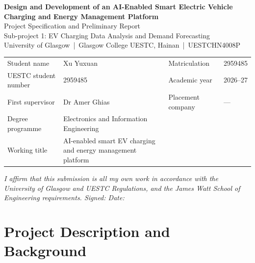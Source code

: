 \documentclass[10pt,a4paper]{article}
\begin{document}
\begin{center}
  {\large\bfseries Design and Development of an AI-Enabled Smart Electric Vehicle\\
   Charging and Energy Management Platform}\\[4pt]
  {\normalsize Project Specification and Preliminary Report}\\[2pt]
  {\small Sub-project 1: EV Charging Data Analysis and Demand Forecasting}\\[6pt]
  {\small University of Glasgow \,|\, Glasgow College UESTC, Hainan \,|\, UESTCHN4008P}
\end{center}

\vspace{-2pt}
{\small
\renewcommand{\arraystretch}{1.15}
\begin{tabular}{@{}p{3.5cm}p{6.6cm}p{2.9cm}p{1.9cm}@{}}
\toprule
Student name & Xu Yuxuan & Matriculation & 2959485 \\
UESTC student number & 2959485 & Academic year & 2026--27 \\
First supervisor & Dr Amer Ghias & Placement company & --- \\
Degree programme & Electronics and Information Engineering & & \\
Working title & AI-enabled smart EV charging and energy management platform & & \\
\bottomrule
\end{tabular}
}

\vspace{4pt}
{\footnotesize\itshape
I affirm that this submission is all my own work in accordance with the University of Glasgow and
UESTC Regulations, and the James Watt School of Engineering requirements. \hfill Signed:
\underline{\hspace{4.2cm}} \quad Date: \underline{\hspace{2.2cm}}}

\section{Project Description and Background}
\end{document}

